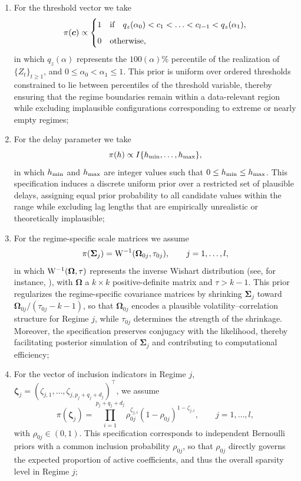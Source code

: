 \begin{enumerate}
    \item[(1)] For the threshold vector we take
\[
\pi(\bm{c})\propto 
\begin{cases}
1 &\text{\rm if}\quad q_z(\alpha_0)<c_1<\ldots<c_{l-1}<q_z(\alpha_1),\\[2mm]
0 &\text{\rm otherwise},
\end{cases}
\]
in which $q_z(\alpha)$ represents the $100(\alpha)\%$ percentile of the realization of $\{Z_t\}_{t\geq 1}$, 
and $0\leq \alpha_0<\alpha_1\leq 1$. This prior is uniform over ordered thresholds constrained to lie between percentiles of the threshold variable, thereby ensuring that the regime boundaries remain within a data-relevant region while excluding implausible configurations corresponding to extreme or nearly empty regimes;
    \item[(2)] For the delay parameter we take
\[
\pi(h)\propto I\{h_{\rm min},\ldots,h_{\rm max}\},
\]
in which $h_{\rm min}$ and $h_{\rm max}$ are integer values such that 
$0\leq h_{\rm min}\leq h_{\rm max}$. 
This specification induces a discrete uniform prior over a restricted set of plausible delays, assigning equal prior probability to all candidate values within the range while excluding lag lengths that are empirically unrealistic or theoretically implausible;
    \item[(3)] For the regime-specific scale matrices we assume 
\[
\pi(\bm{\Sigma}_j) = {\rm W}^{-1}(\bm{\Omega}_{0j},\tau_{0j}), \qquad j=1,\ldots,l,
\]
in which ${\rm W}^{-1}(\bm{\Omega},\tau)$ represents the inverse Wishart distribution (see, for instance, \citet[Section 3.4]{GN99}), with $\bm{\Omega}$ a $k\times k$ positive-definite matrix and $\tau> k-1$. This prior regularizes the regime-specific covariance matrices by shrinking
$\bm{\Sigma}_j$ toward $\bm{\Omega}_{0j}/(\tau_{0j}-k-1)$,
so that $\bm{\Omega}_{0j}$ encodes a plausible volatility–correlation structure for Regime $j$, while $\tau_{0j}$ determines the strength of the shrinkage.
Moreover, the specification preserves conjugacy with the likelihood, thereby facilitating posterior simulation of $\bm{\Sigma}_j$ and contributing to computational efficiency;
    \item[(4)] For the vector of inclusion indicators in Regime $j$, 
$\bm{\zeta}_j = (\zeta_{j,1},\ldots,\zeta_{j,p_j+q_j+d_j})^\top$, we assume
\[
\pi(\bm{\zeta}_j)
= \prod_{i=1}^{p_j+q_j+d_j}\rho_{0j}^{\zeta_{j,i}}(1-\rho_{0j})^{1-\zeta_{j,i}},
\qquad j=1,\ldots,l,
\]
with $\rho_{0j}\in(0,1)$. This specification corresponds to independent Bernoulli priors with a common inclusion probability $\rho_{0j}$, so that $\rho_{0j}$ directly governs the expected proportion of active coefficients, and thus the overall sparsity level in Regime $j$;    

\end{enumerate}
